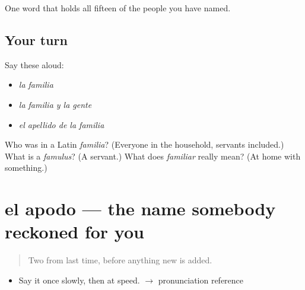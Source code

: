 \begin{grammarlens}[title={What you've built}]
One word that holds all fifteen of the people you have named.
\end{grammarlens}

\subsection*{Your turn}
Say these aloud:

\begin{itemize}
\raggedright
  \item \emph{la familia}
  \item \emph{la familia y la gente}
  \item \emph{el apellido de la familia}
\end{itemize}

\begin{tcolorbox}[breakable,colback=teal!4,colframe=teal!35!black,title={Before you move on}]
Who was in a Latin \emph{familia}? (Everyone in the household, servants included.) What is a \emph{famulus}? (A servant.) What does \emph{familiar} really mean? (At home with something.)
\end{tcolorbox}
\section[el apodo]{el apodo --- the name somebody reckoned for you}

\label{lesson:ES-C309-apodo}



\begin{quote}
Two from last time, before anything new is added.
\end{quote}

\begin{sounds}
\begin{itemize}
\raggedright
  \item Say it once slowly, then at speed. $\to$ pronunciation reference
\end{itemize}
\end{sounds}

